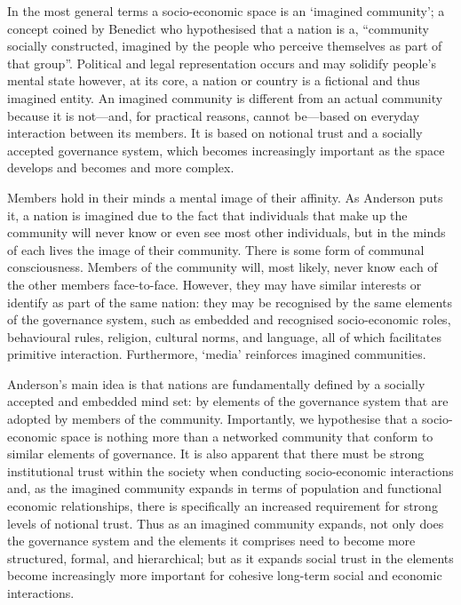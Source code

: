 In the most general terms a socio-economic space is an `imagined community'; a concept coined by Benedict \citet[p.~6--7]{Anderson1983b} who hypothesised that a nation is a, ``community socially constructed, imagined by the people who perceive themselves as part of that group''. Political and legal representation occurs and may solidify people's mental state however, at its core, a nation or country is a fictional and thus imagined entity. An imagined community is different from an actual community because it is not---and, for practical reasons, cannot be---based on everyday interaction between its members. It is based on notional trust and a socially accepted governance system, which becomes increasingly important as the space develops and becomes and more complex.

Members hold in their minds a mental image of their affinity. As Anderson puts it, a nation is imagined due to the fact that individuals that make up the community will never know or even see most other individuals, but in the minds of each lives the image of their community. There is some form of communal consciousness. Members of the community will, most likely, never know each of the other members face-to-face. However, they may have similar interests or identify as part of the same nation: they may be recognised by the same elements of the governance system, such as embedded and recognised socio-economic roles, behavioural rules, religion, cultural norms, and language, all of which facilitates primitive interaction. Furthermore, `media' reinforces imagined communities.

Anderson's main idea is that nations are fundamentally defined by a socially accepted and embedded mind set: by elements of the governance system that are adopted by members of the community. Importantly, we hypothesise that a socio-economic space is nothing more than a networked community that conform to similar elements of governance. It is also apparent that there must be strong institutional trust within the society when conducting socio-economic interactions and, as the imagined community expands in terms of population and functional economic relationships, there is specifically an increased requirement for strong levels of notional trust. Thus as an imagined community expands, not only does the governance system and the elements it comprises need to become more structured, formal, and hierarchical; but as it expands social trust in the elements become increasingly more important for cohesive long-term social and economic interactions. 

